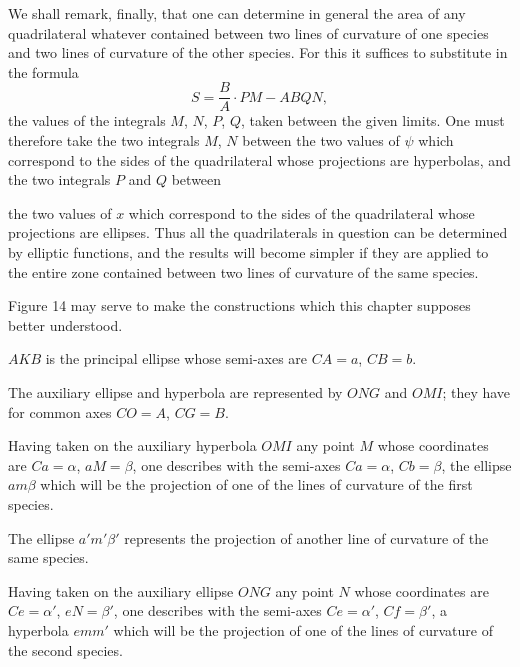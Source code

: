 \documentclass{article}
\begin{document}
We shall remark, finally, that one can determine in general the area of any quadrilateral whatever contained between two lines of curvature of one species and two lines of curvature of the other species. For this it suffices to substitute in the formula
\[ S=\frac{B}{A}\cdot PM-ABQN, \]
the values of the integrals $M$, $N$, $P$, $Q$, taken between the given limits. One must therefore take the two integrals $M$, $N$ between the two values of $\psi$ which correspond to the sides of the quadrilateral whose projections are hyperbolas, and the two integrals $P$ and $Q$ between

the two values of $x$ which correspond to the sides of the quadrilateral whose projections are ellipses. Thus all the quadrilaterals in question can be determined by elliptic functions, and the results will become simpler if they are applied to the entire zone contained between two lines of curvature of the same species.

Figure 14 may serve to make the constructions which this chapter supposes better understood.


$AKB$ is the principal ellipse whose semi-axes are $CA=a$, $CB=b$.

The auxiliary ellipse and hyperbola are represented by $ONG$ and $OMI$; they have for common axes $CO=A$, $CG=B$.

Having taken on the auxiliary hyperbola $OMI$ any point $M$ whose coordinates are $Ca=\alpha$, $aM=\beta$, one describes with the semi-axes $Ca=\alpha$, $Cb=\beta$, the ellipse $am\beta$ which will be the projection of one of the lines of curvature of the first species.

The ellipse $a'm'\beta'$ represents the projection of another line of curvature of the same species.

Having taken on the auxiliary ellipse $ONG$ any point $N$ whose coordinates are $Ce=\alpha'$, $eN=\beta'$, one describes with the semi-axes $Ce=\alpha'$, $Cf=\beta'$, a hyperbola $emm'$ which will be the projection of one of the lines of curvature of the second species.
\end{document}
